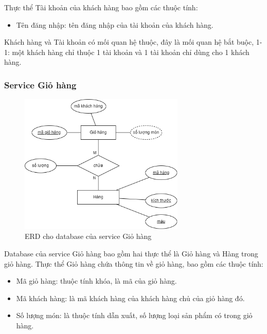 \par Thực thể Tài khoản của khách hàng bao gồm các thuộc tính:
\begin{itemize}
    \item Tên đăng nhập: tên đăng nhập của tài khoản của khách hàng.
\end{itemize}

\par Khách hàng và Tài khoản có mối quan hệ thuộc, đây là mối quan hệ bắt buộc, 1-1: một khách hàng chỉ thuộc 1 tài khoản và 1 tài khoản chỉ dùng cho 1 khách hàng.

\subsubsection{Service Giỏ hàng}
\begin{figure}[!htp]
    \begin{center}
        \includegraphics[width=0.7\textwidth]{img/database/erd/eerd-cart.png}
        \newline
        \caption{ERD cho database của service Giỏ hàng}
    \end{center}
\end{figure}

\par Database của service Giỏ hàng bao gồm hai thực thể là Giỏ hàng và Hàng trong giỏ hàng. Thực thể Giỏ hàng chứa thông tin về giỏ hàng, bao gồm các thuộc tính:
\begin{itemize}
    \item Mã giỏ hàng: thuộc tính khóa, là mã của giỏ hàng.
    \item Mã khách hàng: là mã khách hàng của khách hàng chủ của giỏ hàng đó.
    \item Số lượng món: là thuộc tính dẫn xuất, số lượng loại sản phẩm có trong giỏ hàng.
\end{itemize}

